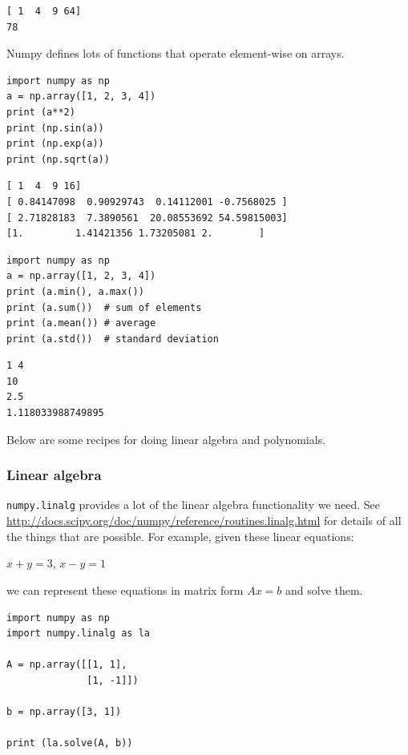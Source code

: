 \documentclass[11pt]{article}
\begin{document}
\begin{verbatim}
[ 1  4  9 64]
78
\end{verbatim}

Numpy defines lots of functions that operate element-wise on arrays.

\begin{verbatim}
import numpy as np
a = np.array([1, 2, 3, 4])
print (a**2)
print (np.sin(a))
print (np.exp(a))
print (np.sqrt(a))
\end{verbatim}

\begin{verbatim}
[ 1  4  9 16]
[ 0.84147098  0.90929743  0.14112001 -0.7568025 ]
[ 2.71828183  7.3890561  20.08553692 54.59815003]
[1.         1.41421356 1.73205081 2.        ]
\end{verbatim}

\begin{verbatim}
import numpy as np
a = np.array([1, 2, 3, 4])
print (a.min(), a.max())
print (a.sum())  # sum of elements
print (a.mean()) # average
print (a.std())  # standard deviation
\end{verbatim}

\begin{verbatim}
1 4
10
2.5
1.118033988749895
\end{verbatim}


Below are some recipes for doing linear algebra and polynomials.


\subsubsection{Linear algebra}
\label{sec:orgda403a7}
\texttt{numpy.linalg} provides a lot of the linear algebra functionality we need. See \url{http://docs.scipy.org/doc/numpy/reference/routines.linalg.html} for details of all the things that are possible. For example, given these linear equations:

\(x + y = 3\), 
\(x - y = 1\)

we can represent these equations in matrix form \(A x = b\) and solve them.

\begin{verbatim}
import numpy as np
import numpy.linalg as la

A = np.array([[1, 1],
              [1, -1]])

b = np.array([3, 1])

print (la.solve(A, b))
\end{verbatim}
\end{document}

